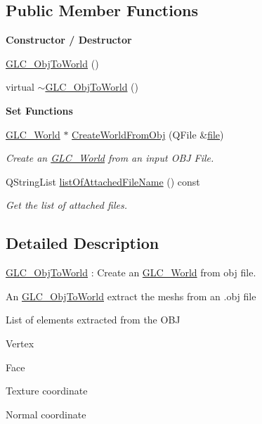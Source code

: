 \subsection*{Public Member Functions}
\begin{Indent}{\bf Constructor / Destructor}\par
\begin{DoxyCompactItemize}
\item 
\hyperlink{class_g_l_c___obj_to_world_a06011130729172aece8bf112ccff8ac0}{G\-L\-C\-\_\-\-Obj\-To\-World} ()
\item 
virtual \hyperlink{class_g_l_c___obj_to_world_a432c9d4828ea248e8f47ff7dd1144aaa}{$\sim$\-G\-L\-C\-\_\-\-Obj\-To\-World} ()
\end{DoxyCompactItemize}
\end{Indent}
\begin{Indent}{\bf Set Functions}\par
\begin{DoxyCompactItemize}
\item 
\hyperlink{class_g_l_c___world}{G\-L\-C\-\_\-\-World} $\ast$ \hyperlink{class_g_l_c___obj_to_world_a79c557d220ebfceef18c089e46802101}{Create\-World\-From\-Obj} (Q\-File \&\hyperlink{uavobjecttemplate_8m_a97c04efa65bcf0928abf9260bc5cbf46}{file})
\begin{DoxyCompactList}\small\item\em Create an \hyperlink{class_g_l_c___world}{G\-L\-C\-\_\-\-World} from an input O\-B\-J File. \end{DoxyCompactList}\item 
Q\-String\-List \hyperlink{class_g_l_c___obj_to_world_ae861ed03a5caf7eefa3c7ee3af3b8055}{list\-Of\-Attached\-File\-Name} () const 
\begin{DoxyCompactList}\small\item\em Get the list of attached files. \end{DoxyCompactList}\end{DoxyCompactItemize}
\end{Indent}


\subsection{Detailed Description}
\hyperlink{class_g_l_c___obj_to_world}{G\-L\-C\-\_\-\-Obj\-To\-World} \-: Create an \hyperlink{class_g_l_c___world}{G\-L\-C\-\_\-\-World} from obj file. 

An \hyperlink{class_g_l_c___obj_to_world}{G\-L\-C\-\_\-\-Obj\-To\-World} extract the meshs from an .obj file \par
 List of elements extracted from the O\-B\-J
\begin{DoxyItemize}
\item Vertex
\item Face
\item Texture coordinate
\item Normal coordinate 
\end{DoxyItemize}

